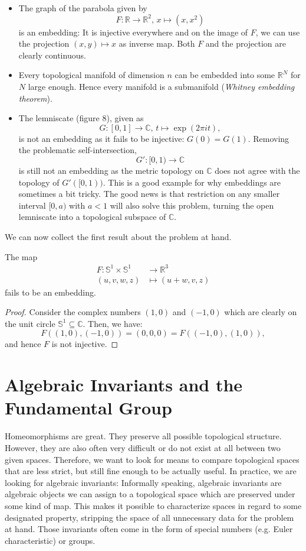 \begin{eg}
    \begin{itemize}
        \item The graph of the parabola given by $$F: \mathbb{R} \to \mathbb{R}^2, \, x \mapsto (x, x^2)$$ is an embedding: It is injective everywhere and on the image of $F$, we can use the projection $(x,y) \mapsto x$ as inverse map. Both $F$ and the projection are clearly continuous.
        \item Every topological manifold of dimension $n$ can be embedded into some $\mathbb{R}^N$ for $N$ large enough. Hence every manifold is a submanifold (\emph{Whitney embedding theorem}).
        \item The lemniscate (figure 8), given as $$G: [0,1] \to \mathbb{C}, \, t \mapsto \exp(2 \pi i t),$$ is not an embedding as it fails to be injective: $G(0)=G(1)$. Removing the problematic self-intersection, $$G': [0,1) \to \mathbb{C}$$ is still not an embedding as the metric topology on $\mathbb{C}$ does not agree with the topology of $G'([0,1))$. This is a good example for why embeddings are sometimes a bit tricky. The good news is that restriction on any smaller interval $[0,a)$ with $a < 1$ will also solve this problem, turning the open lemniscate into a topological subspace of $\mathbb{C}$.
    \end{itemize}
\end{eg}
We can now collect the first result about the problem at hand.
\begin{prop}
   The map 
   \begin{align}
       F:  \mathbb{S}^1 \times \mathbb{S}^1 &\to \mathbb{R}^3\\
       (u,v,w,z) &\mapsto (u+w, v, z)
   \end{align}
   fails to be an embedding.
\end{prop}
\begin{proof}
    Consider the complex numbers $(1,0)$ and $(-1,0)$ which are clearly on the unit circle $\mathbb{S}^1 \subseteq \mathbb{C}$. Then, we have: 
    \begin{equation*}
        F((1,0),(-1,0))=(0,0,0)=F((-1,0),(1,0)),
    \end{equation*}
    and hence $F$ is not injective.
\end{proof}
\section{Algebraic Invariants and the Fundamental Group}
Homeomorphisms are great. They preserve all possible topological structure. However, they are also often very difficult or do not exist at all between two given spaces. Therefore, we want to look for means to compare topological spaces that are less strict, but still fine enough to be actually useful. In practice, we are looking for algebraic invariants: Informally speaking, algebraic invariants are algebraic objects we can assign to a topological space which are preserved under some kind of map. This makes it possible to characterize spaces in regard to some designated property, stripping the space of all unnecessary data for the problem at hand. Those invariants often come in the form of special numbers (e.g. Euler characteristic) or groups.


